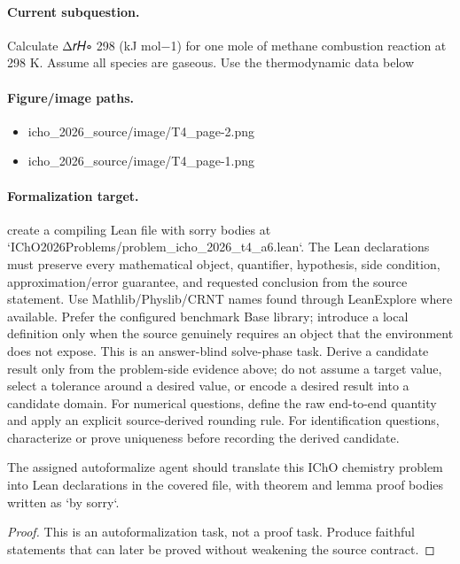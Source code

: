 \paragraph{Current subquestion.}
Calculate Δ𝑟𝐻∘ 298 (kJ mol−1) for one mole of methane combustion reaction at 298 K. Assume all species are gaseous. Use the thermodynamic data below

\paragraph{Figure/image paths.}
\begin{itemize}
\item icho\_2026\_source/image/T4\_page-2.png
\item icho\_2026\_source/image/T4\_page-1.png
\end{itemize}

\paragraph{Formalization target.}
create a compiling Lean file with sorry bodies at `IChO2026Problems/problem\_icho\_2026\_t4\_a6.lean`.
The Lean declarations must preserve every mathematical object, quantifier, hypothesis, side condition, approximation/error guarantee, and requested conclusion from the source statement.
Use Mathlib/Physlib/CRNT names found through LeanExplore where available. Prefer the configured benchmark Base library; introduce a local definition only when the source genuinely requires an object that the environment does not expose.
This is an answer-blind solve-phase task. Derive a candidate result only from the problem-side evidence above; do not assume a target value, select a tolerance around a desired value, or encode a desired result into a candidate domain.
For numerical questions, define the raw end-to-end quantity and apply an explicit source-derived rounding rule. For identification questions, characterize or prove uniqueness before recording the derived candidate.

\begin{theorem}
\label{thm:physics:icho_2026_t4_a6:target}
The assigned autoformalize agent should translate this IChO chemistry problem into Lean declarations in the covered file, with theorem and lemma proof bodies written as `by sorry`.
\end{theorem}
\begin{proof}
This is an autoformalization task, not a proof task. Produce faithful statements that can later be proved without weakening the source contract.
\end{proof}
